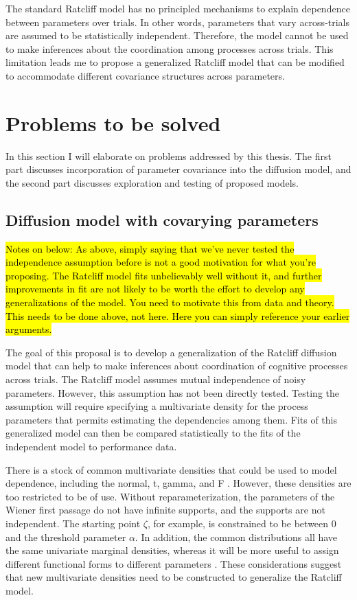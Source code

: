 \documentclass[12pt]{article}
\newcommand{\trish}[1]{\textrm{\hl{#1}}}
\begin{document}
The standard Ratcliff model has no principled mechanisms to explain dependence between parameters over trials.
In other words, parameters that vary across-trials are assumed to be statistically independent. Therefore, the model cannot be used to make inferences about the coordination among processes
across trials. This limitation leads me to propose a generalized
Ratcliff model that can be modified to accommodate different covariance
structures across parameters.

\section{Problems to be solved}

In this section I will elaborate on problems addressed by this thesis. The first part discusses incorporation of parameter covariance into the diffusion model, and the second part discusses exploration and testing of proposed models.

\subsection{Diffusion model with covarying parameters}

\trish{Notes on below: As above, simply saying that we've never tested the
independence assumption before is not a good motivation for what you're
proposing.  The Ratcliff model fits unbelievably well without it, and further
improvements in fit are not likely to be worth the effort to develop any
generalizations of the model.  You need to motivate this from data and theory.  This
needs to be done above, not here.  Here you can simply reference your
earlier arguments.}

The goal of this proposal is to develop a generalization of
the Ratcliff diffusion model that can help to make inferences about
coordination of cognitive processes across trials. The Ratcliff model
assumes mutual independence of noisy parameters. However, this
assumption has not been directly tested. Testing the assumption
will require specifying a multivariate density for the process
parameters that permits estimating the dependencies among them.
Fits of this generalized model can then be compared statistically
to the fits of the independent model to performance data.
    
There is a stock of common multivariate densities that could be used
to model dependence, including the normal, t, gamma, and F
\citep{KotBal2004}. However, these densities are too restricted to
be of use. Without
reparameterization, the parameters of the Wiener first passage do not have
infinite supports, and the supports are not independent.  The starting
point $\zeta$, for example, is constrained to be between 0 and the
threshold parameter $\alpha$.
In addition, the common distributions all have the same univariate
marginal densities, whereas it will be more useful to assign
different functional forms to different parameters
\citep{Rat2013}. These considerations suggest that new multivariate
densities need to be constructed to generalize the Ratcliff model.
\end{document}
